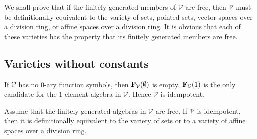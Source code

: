 We shall prove that if the
finitely generated members of $\mathcal V$ are free,
then $\mathcal V$ must be definitionally
equivalent to the variety of sets, pointed sets, vector
spaces over a division ring, or affine spaces over a division
ring. It is obvious that each of these varieties
has the property that its finitely generated members are free.

\subsection{Varieties without constants}\label{subsection1}

If $\mathcal V$ has no $0$-ary function symbols, then
${{\mathbf{\uppercase{f}}}}_{\mathcal V}(\emptyset)$ is empty. ${{\mathbf{\uppercase{f}}}}_{\mathcal V}(1)$
is the only candidate for the $1$-element
algebra in $\mathcal V$. Hence $\mathcal V$ is idempotent.

\begin{thm}\label{idempotent}
  Assume that the finitely generated algebras in $\mathcal V$ are free.
  If $\mathcal V$ is idempotent, then it is definitionally equivalent
  to the variety of sets or to a variety of affine
  spaces over a division ring.
  \end{thm}

